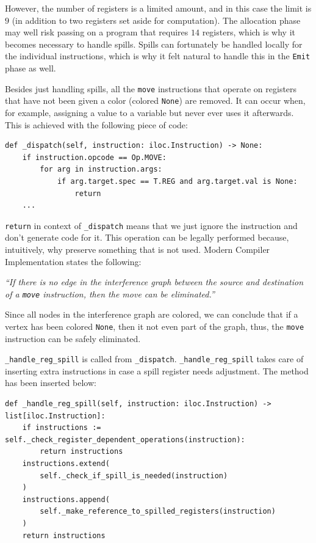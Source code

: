 However, the number of registers is a limited amount, and in this case the limit is $9$ (in addition to two registers set aside for computation). The allocation phase may well risk passing on a program that requires $14$ registers, which is why it becomes necessary to handle spills. Spills can fortunately be handled locally for the individual instructions, which is why it felt natural to handle this in the \texttt{Emit} phase as well.

Besides just handling spills, all the \texttt{move} instructions that operate on registers that have not been given a color (colored \texttt{None}) are removed. It can occur when, for example, assigning a value to a variable but never ever uses it afterwards. This is achieved with the following piece of code:

\begin{verbatim}
def _dispatch(self, instruction: iloc.Instruction) -> None:
    if instruction.opcode == Op.MOVE:
        for arg in instruction.args:
            if arg.target.spec == T.REG and arg.target.val is None:
                return
    ...
\end{verbatim}

\texttt{return} in context of \texttt{\_dispatch} means that we just ignore the instruction and don't generate code for it. This operation can be legally performed because, intuitively, why preserve something that is not used. Modern Compiler Implementation states the following:

\begin{displayquote}
    \textit{``If there is no edge in the interference graph between the source and destination of a \texttt{move} instruction, then the move can be eliminated.''}
\end{displayquote}
\hspace*{}

Since all nodes in the interference graph are colored, we can conclude that if a vertex has been colored \texttt{None}, then it not even part of the graph, thus, the \texttt{move} instruction can be safely eliminated.

\texttt{\_handle\_reg\_spill} is called from \texttt{\_dispatch}. \texttt{\_handle\_reg\_spill} takes care of inserting extra instructions in case a spill register needs adjustment. The method has been inserted below:

\begin{verbatim}
def _handle_reg_spill(self, instruction: iloc.Instruction) -> list[iloc.Instruction]:
    if instructions := self._check_register_dependent_operations(instruction):
        return instructions
    instructions.extend(
        self._check_if_spill_is_needed(instruction)
    )
    instructions.append(
        self._make_reference_to_spilled_registers(instruction)
    )
    return instructions
\end{verbatim}

